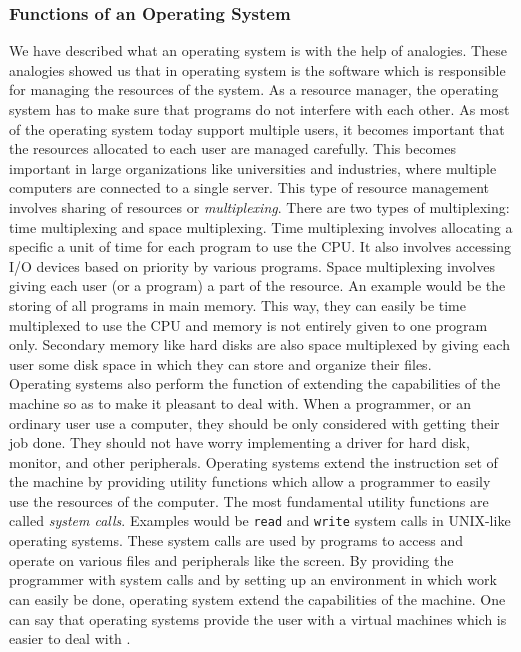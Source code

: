 \subsubsection{Functions of an Operating System}
We have described what an operating system is with the help of analogies. These analogies showed us that in operating system is the software which is responsible for managing the resources of the system. As a resource manager, the operating system has to make sure that programs do not interfere with each other. As most of the operating system today support multiple users, it becomes important that the resources allocated to each user are managed carefully. This becomes important in large organizations like universities and industries, where multiple computers are connected to a single server. This type of resource management involves sharing of resources or \textit{multiplexing}. There are two types of multiplexing: time multiplexing and space multiplexing. Time multiplexing involves allocating a specific a unit of time for each program to use the CPU. It also involves accessing I/O devices based on priority by various programs.  Space multiplexing involves giving each user (or a program) a part of the resource. An example would be the storing of all programs in main memory. This way, they can easily be time multiplexed to use the CPU and memory is not entirely given to one program only. Secondary memory like hard disks are also space multiplexed by giving each user some disk space in which they can store and organize their files.\\
Operating systems also perform the function of extending the capabilities of the machine so as to make it pleasant to deal with. When a programmer, or an ordinary user use a computer, they should be only considered with getting their job done. They should not have worry implementing a driver for hard disk, monitor, and other peripherals. Operating systems extend the instruction set of the machine by providing utility functions which allow a programmer to easily use the resources of the computer. The most fundamental utility functions are called \textit{system calls}. Examples would be \verb|read| and \verb|write| system calls in UNIX-like operating systems. These system calls are used by programs to access and operate on various files and peripherals like the screen. By providing the programmer with system calls and by setting up an environment in which work can easily be done, operating system extend the capabilities of the machine. One can say that operating systems provide the user with a virtual machines which is easier to deal with \cite{tannenbaum2003operating}.  

